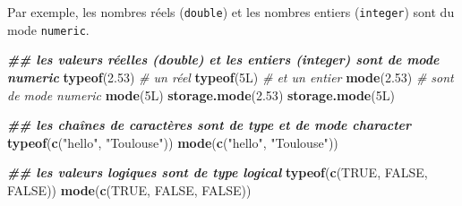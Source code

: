 \documentclass[
]{book}
\newenvironment{Shaded}{\begin{snugshade}}{\end{snugshade}}
\newcommand{\CommentTok}[1]{\textcolor[rgb]{0.56,0.35,0.01}{\textit{#1}}}
\newcommand{\ConstantTok}[1]{\textcolor[rgb]{0.56,0.35,0.01}{#1}}
\newcommand{\DataTypeTok}[1]{\textcolor[rgb]{0.13,0.29,0.53}{#1}}
\newcommand{\DecValTok}[1]{\textcolor[rgb]{0.00,0.00,0.81}{#1}}
\newcommand{\DocumentationTok}[1]{\textcolor[rgb]{0.56,0.35,0.01}{\textbf{\textit{#1}}}}
\newcommand{\FloatTok}[1]{\textcolor[rgb]{0.00,0.00,0.81}{#1}}
\newcommand{\FunctionTok}[1]{\textcolor[rgb]{0.13,0.29,0.53}{\textbf{#1}}}
\newcommand{\NormalTok}[1]{#1}
\newcommand{\StringTok}[1]{\textcolor[rgb]{0.31,0.60,0.02}{#1}}
\begin{document}
Par exemple, les nombres réels (\texttt{double}) et les nombres entiers (\texttt{integer}) sont du mode \texttt{numeric}.

\begin{Shaded}
\begin{Highlighting}[]
\DocumentationTok{\#\# les valeurs réelles (\textquotesingle{}double\textquotesingle{}) et les entiers (\textquotesingle{}integer\textquotesingle{}) sont de mode \textquotesingle{}numeric\textquotesingle{}}
\FunctionTok{typeof}\NormalTok{(}\FloatTok{2.53}\NormalTok{) }\CommentTok{\# un réel}
\FunctionTok{typeof}\NormalTok{(}\DecValTok{5}\DataTypeTok{L}\NormalTok{) }\CommentTok{\# et un entier}
\FunctionTok{mode}\NormalTok{(}\FloatTok{2.53}\NormalTok{) }\CommentTok{\# sont de mode \textquotesingle{}numeric\textquotesingle{}}
\FunctionTok{mode}\NormalTok{(}\DecValTok{5}\DataTypeTok{L}\NormalTok{)}
\FunctionTok{storage.mode}\NormalTok{(}\FloatTok{2.53}\NormalTok{)}
\FunctionTok{storage.mode}\NormalTok{(}\DecValTok{5}\DataTypeTok{L}\NormalTok{)}

\DocumentationTok{\#\# les chaînes de caractères sont de type et de mode \textquotesingle{}character\textquotesingle{}}
\FunctionTok{typeof}\NormalTok{(}\FunctionTok{c}\NormalTok{(}\StringTok{"hello"}\NormalTok{, }\StringTok{"Toulouse"}\NormalTok{))}
\FunctionTok{mode}\NormalTok{(}\FunctionTok{c}\NormalTok{(}\StringTok{"hello"}\NormalTok{, }\StringTok{"Toulouse"}\NormalTok{))}

\DocumentationTok{\#\# les valeurs logiques sont de type \textquotesingle{}logical\textquotesingle{}}
\FunctionTok{typeof}\NormalTok{(}\FunctionTok{c}\NormalTok{(}\ConstantTok{TRUE}\NormalTok{, }\ConstantTok{FALSE}\NormalTok{, }\ConstantTok{FALSE}\NormalTok{))}
\FunctionTok{mode}\NormalTok{(}\FunctionTok{c}\NormalTok{(}\ConstantTok{TRUE}\NormalTok{, }\ConstantTok{FALSE}\NormalTok{, }\ConstantTok{FALSE}\NormalTok{))}
\end{Highlighting}
\end{Shaded}
\end{document}
